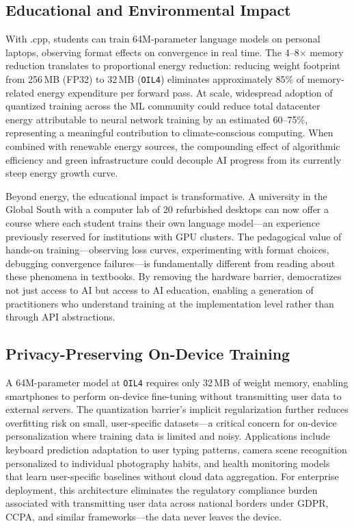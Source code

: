 \subsection{Educational and Environmental Impact}

With \MYTHOS{}.cpp, students can train 64M-parameter language models on personal laptops, observing format effects on convergence in real time. The 4--8$\times$ memory reduction translates to proportional energy reduction: reducing weight footprint from 256\,MB (FP32) to 32\,MB (\texttt{OIL4}) eliminates approximately 85\% of memory-related energy expenditure per forward pass. At scale, widespread adoption of quantized training across the ML community could reduce total datacenter energy attributable to neural network training by an estimated 60--75\%, representing a meaningful contribution to climate-conscious computing. When combined with renewable energy sources, the compounding effect of algorithmic efficiency and green infrastructure could decouple AI progress from its currently steep energy growth curve.

Beyond energy, the educational impact is transformative. A university in the Global South with a computer lab of 20 refurbished desktops can now offer a course where each student trains their own language model---an experience previously reserved for institutions with GPU clusters. The pedagogical value of hands-on training---observing loss curves, experimenting with format choices, debugging convergence failures---is fundamentally different from reading about these phenomena in textbooks. By removing the hardware barrier, \OIL{} democratizes not just access to AI but access to AI education, enabling a generation of practitioners who understand training at the implementation level rather than through API abstractions.

\subsection{Privacy-Preserving On-Device Training}

A 64M-parameter model at \texttt{OIL4} requires only 32\,MB of weight memory, enabling smartphones to perform on-device fine-tuning without transmitting user data to external servers. The quantization barrier's implicit regularization further reduces overfitting risk on small, user-specific datasets---a critical concern for on-device personalization where training data is limited and noisy. Applications include keyboard prediction adaptation to user typing patterns, camera scene recognition personalized to individual photography habits, and health monitoring models that learn user-specific baselines without cloud data aggregation. For enterprise deployment, this architecture eliminates the regulatory compliance burden associated with transmitting user data across national borders under GDPR, CCPA, and similar frameworks---the data never leaves the device.

